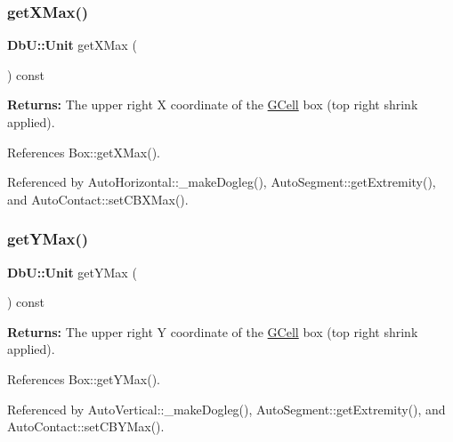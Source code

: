\mbox{\label{classKatabatic_1_1GCell_aaf7ff16cd2fd5a3fa4c5221efb9b9b76}} 
\subsubsection{\texorpdfstring{get\+X\+Max()}{getXMax()}}
{\footnotesize\ttfamily \textbf{ Db\+U\+::\+Unit} get\+X\+Max (\begin{DoxyParamCaption}{ }\end{DoxyParamCaption}) const\hspace{0.3cm}{\ttfamily [inline]}}

{\bfseries Returns\+:} The upper right X coordinate of the \mbox{\hyperlink{classKatabatic_1_1GCell}{G\+Cell}} box (top right shrink applied). 

References Box\+::get\+X\+Max().



Referenced by Auto\+Horizontal\+::\+\_\+make\+Dogleg(), Auto\+Segment\+::get\+Extremity(), and Auto\+Contact\+::set\+C\+B\+X\+Max().

\mbox{\label{classKatabatic_1_1GCell_a096a92c18156eac4268efb50496a2d18}} 
\subsubsection{\texorpdfstring{get\+Y\+Max()}{getYMax()}}
{\footnotesize\ttfamily \textbf{ Db\+U\+::\+Unit} get\+Y\+Max (\begin{DoxyParamCaption}{ }\end{DoxyParamCaption}) const\hspace{0.3cm}{\ttfamily [inline]}}

{\bfseries Returns\+:} The upper right Y coordinate of the \mbox{\hyperlink{classKatabatic_1_1GCell}{G\+Cell}} box (top right shrink applied). 

References Box\+::get\+Y\+Max().



Referenced by Auto\+Vertical\+::\+\_\+make\+Dogleg(), Auto\+Segment\+::get\+Extremity(), and Auto\+Contact\+::set\+C\+B\+Y\+Max().


